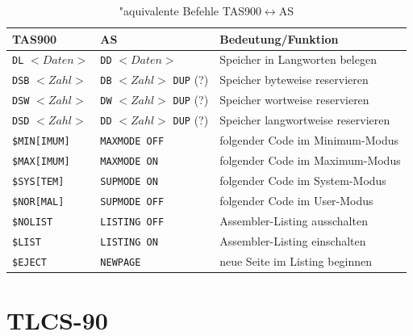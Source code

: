 \documentclass[12pt,a4paper,twoside]{report}
\newcommand{\tty}[1]{{\tt #1}}
\newcommand{\asname}{AS}
\begin{document}
\begin{table}[htbp]
\begin{center}\begin{tabular}{|l|l|l|}
\hline
TAS900        &   \asname{}                & Bedeutung/Funktion \\
\hline
\hline
\tty{DL} $<Daten>$  & \tty{DD} $<Daten>$              & Speicher in Langworten belegen \\
\hline
\tty{DSB} $<Zahl>$  & \tty{DB} $<Zahl>$ \tty{DUP} (?) & Speicher byteweise reservieren \\
\hline
\tty{DSW} $<Zahl>$  & \tty{DW} $<Zahl>$ \tty{DUP} (?) & Speicher wortweise reservieren \\
\hline
\tty{DSD} $<Zahl>$  & \tty{DD} $<Zahl>$ \tty{DUP} (?) & Speicher langwortweise reservieren \\
\hline
\tty{\$MIN[IMUM]}   & \tty{MAXMODE OFF}         & folgender Code im Minimum-Modus \\
\hline
\tty{\$MAX[IMUM]}   & \tty{MAXMODE ON}          & folgender Code im Maximum-Modus \\
\hline
\tty{\$SYS[TEM]}    & \tty{SUPMODE ON}          & folgender Code im System-Modus \\
\hline
\tty{\$NOR[MAL]}    & \tty{SUPMODE OFF}         & folgender Code im User-Modus \\
\hline
\tty{\$NOLIST}      & \tty{LISTING OFF}         & Assembler-Listing ausschalten \\
\hline
\tty{\$LIST}        & \tty{LISTING ON}          & Assembler-Listing einschalten \\
\hline
\tty{\$EJECT}       & \tty{NEWPAGE}             & neue Seite im Listing beginnen \\
\hline
\end{tabular}\end{center}
\caption{"aquivalente Befehle TAS900$\leftrightarrow$\asname{}\label{TabTAS900}}
\end{table}


\section{TLCS-90}
\end{document}
